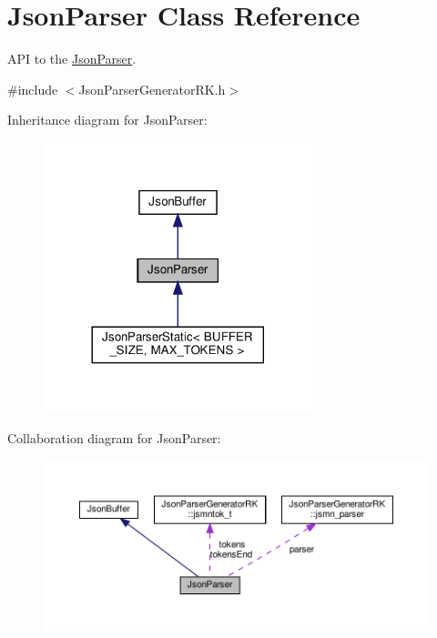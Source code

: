 \hypertarget{class_json_parser}{}\section{Json\+Parser Class Reference}
\label{class_json_parser}


A\+PI to the \hyperlink{class_json_parser}{Json\+Parser}.  




{\ttfamily \#include $<$Json\+Parser\+Generator\+R\+K.\+h$>$}



Inheritance diagram for Json\+Parser\+:
\nopagebreak
\begin{figure}[H]
\begin{center}
\leavevmode
\includegraphics[width=221pt]{class_json_parser__inherit__graph}
\end{center}
\end{figure}


Collaboration diagram for Json\+Parser\+:
\nopagebreak
\begin{figure}[H]
\begin{center}
\leavevmode
\includegraphics[width=350pt]{class_json_parser__coll__graph}
\end{center}
\end{figure}
